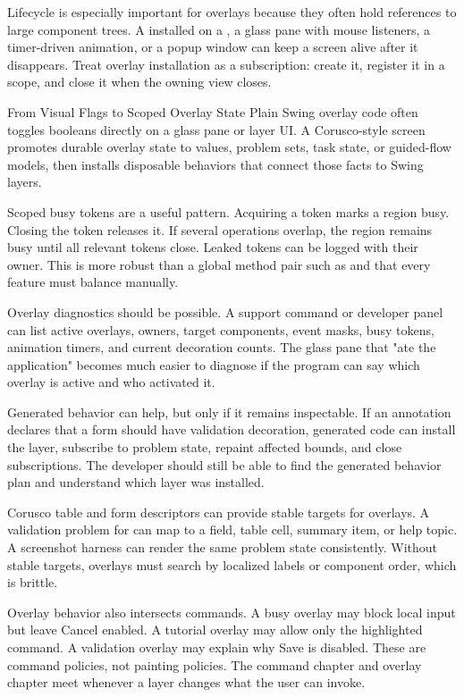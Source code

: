 Lifecycle is especially important for overlays because they often hold references to large component trees. A  installed on a , a glass pane with mouse listeners, a timer-driven animation, or a popup window can keep a screen alive after it disappears. Treat overlay installation as a subscription: create it, register it in a scope, and close it when the owning view closes.

\begin{migrationbox}{From Visual Flags to Scoped Overlay State}
Plain Swing overlay code often toggles booleans directly on a glass pane or layer UI. A Corusco-style screen promotes durable overlay state to values, problem sets, task state, or guided-flow models, then installs disposable behaviors that connect those facts to Swing layers.
\end{migrationbox}

Scoped busy tokens are a useful pattern. Acquiring a token marks a region busy. Closing the token releases it. If several operations overlap, the region remains busy until all relevant tokens close. Leaked tokens can be logged with their owner. This is more robust than a global method pair such as  and  that every feature must balance manually.

Overlay diagnostics should be possible. A support command or developer panel can list active overlays, owners, target components, event masks, busy tokens, animation timers, and current decoration counts. The glass pane that "ate the application" becomes much easier to diagnose if the program can say which overlay is active and who activated it.

Generated behavior can help, but only if it remains inspectable. If an annotation declares that a form should have validation decoration, generated code can install the layer, subscribe to problem state, repaint affected bounds, and close subscriptions. The developer should still be able to find the generated behavior plan and understand which layer was installed.

Corusco table and form descriptors can provide stable targets for overlays. A validation problem for  can map to a field, table cell, summary item, or help topic. A screenshot harness can render the same problem state consistently. Without stable targets, overlays must search by localized labels or component order, which is brittle.

Overlay behavior also intersects commands. A busy overlay may block local input but leave Cancel enabled. A tutorial overlay may allow only the highlighted command. A validation overlay may explain why Save is disabled. These are command policies, not painting policies. The command chapter and overlay chapter meet whenever a layer changes what the user can invoke.

